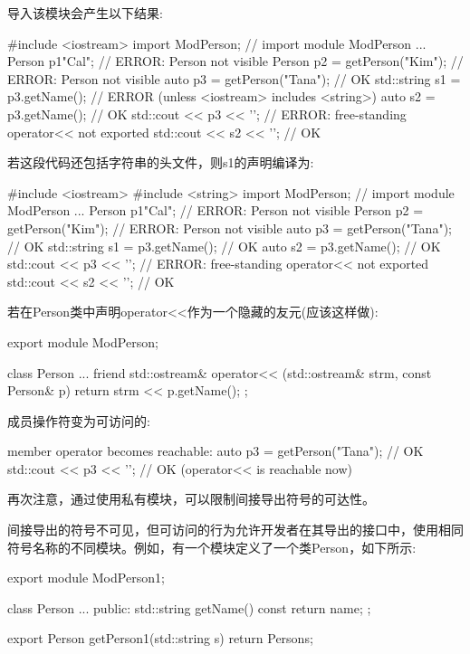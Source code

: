 导入该模块会产生以下结果:

\begin{cpp}
#include <iostream>
import ModPerson; // import module ModPerson
...
Person p1{"Cal"}; // ERROR: Person not visible
Person p2 = getPerson("Kim"); // ERROR: Person not visible
auto p3 = getPerson("Tana"); // OK
std::string s1 = p3.getName(); // ERROR (unless <iostream> includes <string>)
auto s2 = p3.getName(); // OK
std::cout << p3 << '\n'; // ERROR: free-standing operator<< not exported
std::cout << s2 << '\n'; // OK
\end{cpp}

若这段代码还包括字符串的头文件，则s1的声明编译为:

\begin{cpp}
#include <iostream>
#include <string>
import ModPerson; // import module ModPerson
...
Person p1{"Cal"}; // ERROR: Person not visible
Person p2 = getPerson("Kim"); // ERROR: Person not visible
auto p3 = getPerson("Tana"); // OK
std::string s1 = p3.getName(); // OK
auto s2 = p3.getName(); // OK
std::cout << p3 << '\n'; // ERROR: free-standing operator<< not exported
std::cout << s2 << '\n'; // OK
\end{cpp}

若在Person类中声明operator<{}<作为一个隐藏的友元(应该这样做):

\begin{cpp}
export module ModPerson;

class Person {
	...
	friend std::ostream& operator<< (std::ostream& strm, const Person& p) {
		return strm << p.getName();
	}
};
\end{cpp}

成员操作符变为可访问的:

\begin{cpp}
member operator becomes reachable:
auto p3 = getPerson("Tana"); // OK
std::cout << p3 << '\n'; // OK (operator<< is reachable now)
\end{cpp}

再次注意，通过使用私有模块，可以限制间接导出符号的可达性。


间接导出的符号不可见，但可访问的行为允许开发者在其导出的接口中，使用相同符号名称的不同模块。例如，有一个模块定义了一个类Person，如下所示:

\begin{cpp}
export module ModPerson1;

class Person {
	...
	public:
	std::string getName() const {
		return name;
	}
};

export Person getPerson1(std::string s) {
	return Person{s};
}
\end{cpp}

